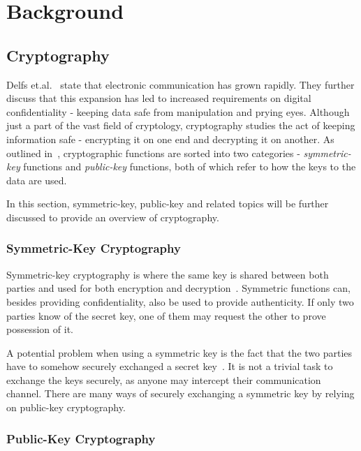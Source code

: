 \chapter{Background}
\label{chapter:background}

\section{Cryptography}

Delfs et.al.~\cite{delfs2007} state that electronic communication has grown rapidly. They further discuss that this expansion has led to increased requirements on digital confidentiality - keeping data safe from manipulation and prying eyes. Although just a part of the vast field of cryptology, cryptography studies the act of keeping information safe - encrypting it on one end and decrypting it on another. As outlined in~\cite{bernstein2017}, cryptographic functions are sorted into two categories - \textit{symmetric-key} functions and \textit{public-key} functions, both of which refer to how the keys to the data are used.

In this section, symmetric-key, public-key and related topics will be further discussed to provide an overview of cryptography.

\subsection{Symmetric-Key Cryptography}

Symmetric-key cryptography is where the same key is shared between both parties and used for both encryption and decryption~\cite{bernstein2017}. Symmetric functions can, besides providing confidentiality, also be used to provide authenticity. If only two parties know of the secret key, one of them may request the other to prove possession of it.

A potential problem when using a symmetric key is the fact that the two parties have to somehow securely exchanged a secret key~\cite{delfs2007}. It is not a trivial task to exchange the keys securely, as anyone may intercept their communication channel. There are many ways of securely exchanging a symmetric key by relying on public-key cryptography.

\subsection{Public-Key Cryptography}
\label{section:background:public-key-cryptography}

